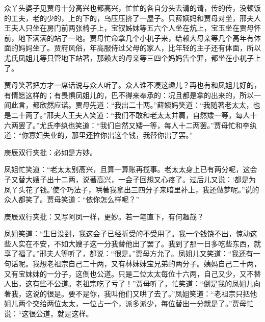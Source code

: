 \begin{parag}


    众丫头婆子见贾母十分高兴也都高兴，忙忙的各自分头去请的请，传的传，没顿饭的工夫，老的少的，上的下的，乌压压挤了一屋子。只薛姨妈和贾母对坐，邢夫人王夫人只坐在房门前两张椅子上，宝钗姊妹等五六个人坐在炕上，宝玉坐在贾母怀前，地下满满的站了一地。贾母忙命拿几个小杌子来，给赖大母亲等几个高年有体面的妈妈坐了。贾府风俗，年高服侍过父母的家人，比年轻的主子还有体面，所以尤氏凤姐儿等只管地下站著，那赖大的母亲等三四个妈妈告个罪，都坐在小杌子上了。
\end{parag}


\begin{parag}


    贾母笑著把方才一席话说与众人听了。众人谁不凑这趣儿？再也有和凤姐儿好的，有情愿这样的；有畏惧凤姐儿的，巴不得来奉承的：况且都是拿的出来的，所以一闻此言，都欣然应诺。贾母先道：“我出二十两。”薛姨妈笑道：“我随著老太太，也是二十两了。”邢夫人王夫人笑道：“我们不敢和老太太并肩，自然矮一等，每人十六两罢了。”尤氏李纨也笑道：“我们自然又矮一等，每人十二两罢。”贾母忙和李纨道：“你寡妇失业的，那里还拉你出这个钱，我替你出了罢。”\begin{note}庚辰双行夹批：必如是方妙。\end{note}凤姐忙笑道：“老太太别高兴，且算一算账再揽事。老太太身上已有两分呢，这会子又替大嫂子出十二两，说著高兴，一会子回想又心疼了。过后儿又说：‘都是为凤丫头花了钱。’使个巧法子，哄著我拿出三四分子来暗里补上，我还做梦呢。”说的众人都笑了。贾母笑道：“依你怎么样呢？”\begin{note}庚辰双行夹批：又写阿凤一样，更妙。若一笔直下，有何趣哉？\end{note}凤姐笑道：“生日没到，我这会子已经折受的不受用了。我一个钱饶不出，惊动这些人实在不安，不如大嫂子这一分我替他出了罢了。我到了那一日多吃些东西，就享了福了。”邢夫人等听了，都说：“很是。”贾母方允了。凤姐儿又笑道：“我还有一句话呢。我想老祖宗自己二十两，又有林妹妹宝兄弟的两分子。姨妈自己二十两，又有宝妹妹的一分子，这倒也公道。只是二位太太每位十六两，自己又少，又不替人出，这有些不公道。老祖宗吃了亏了！”贾母听了，忙笑道：“倒是我的凤姐儿向著我，这说的很是。要不是你，我叫他们又哄了去了。”凤姐笑道：“老祖宗只把他姐儿两个交给两位太太，一位占一个，派多派少，每位替出一分就是了。”贾母忙说：“这很公道，就是这样。
\end{parag}
